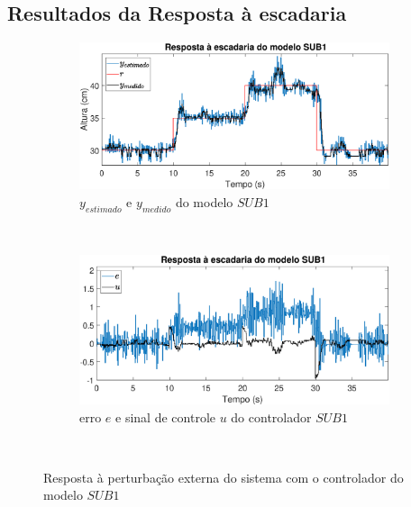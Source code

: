\subsection{Resultados da Resposta à escadaria}\label{rstair}
\begin{figure}[H]
	\centering
	\begin{subfigure}[b]{1\textwidth}
		\includegraphics[width=1\linewidth]{stairrsub1y}
		\caption[$y_{estimado}$ e $y_{medido}$ do modelo $SUB1$]{$y_{estimado}$ e $y_{medido}$ do modelo $SUB1$}
		\label{fig:stairrsub1y}
	\end{subfigure}
	~ %
	\begin{subfigure}[b]{1\textwidth}
		\includegraphics[width=1\linewidth]{stairrsub1e}
		\caption[erro $e$ e sinal de controle $u$ do controlador $SUB1$]{erro $e$ e sinal de controle $u$ do controlador $SUB1$}
		\label{fig:stairrsub1e}
	\end{subfigure}
	~ %
	
	\caption{Resposta à perturbação externa do sistema com o controlador do modelo $SUB1$}\label{fig:stairrsub1}
\end{figure}


